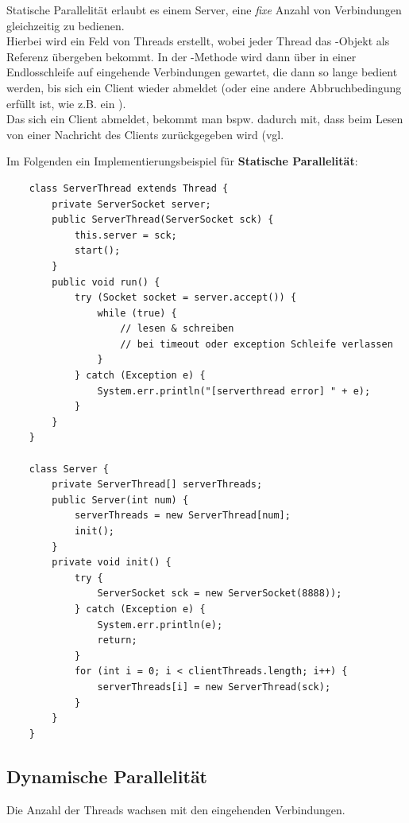 \noindent
Statische Parallelität erlaubt es einem Server, eine \textit{fixe} Anzahl von Verbindungen gleichzeitig zu bedienen.\\
Hierbei wird ein Feld von Threads erstellt, wobei jeder Thread das -Objekt als Referenz übergeben bekommt.
In der -Methode wird dann über  in einer Endlosschleife auf eingehende Verbindungen gewartet, die dann so lange bedient werden, bis sich ein Client wieder abmeldet (oder eine andere Abbruchbedingung erfüllt ist, wie z.B. ein ).\\
Das sich ein Client abmeldet, bekommt man bspw. dadurch mit, dass  beim Lesen von einer Nachricht des Clients zurückgegeben wird (vgl. \cite[286]{Oec22}

\noindent
Im Folgenden ein Implementierungsbeispiel für \textbf{Statische Parallelität}:
\begin{verbatim}
    class ServerThread extends Thread {
        private ServerSocket server;
        public ServerThread(ServerSocket sck) {
            this.server = sck;
            start();
        }
        public void run() {
            try (Socket socket = server.accept()) {
                while (true) {
                    // lesen & schreiben
                    // bei timeout oder exception Schleife verlassen
                }
            } catch (Exception e) {
                System.err.println("[serverthread error] " + e);
            }
        }
    }

    class Server {
        private ServerThread[] serverThreads;
        public Server(int num) {
            serverThreads = new ServerThread[num];
            init();
        }
        private void init() {
            try {
                ServerSocket sck = new ServerSocket(8888));
            } catch (Exception e) {
                System.err.println(e);
                return;
            }
            for (int i = 0; i < clientThreads.length; i++) {
                serverThreads[i] = new ServerThread(sck);
            }
        }
    }
\end{verbatim}

\subsection*{Dynamische Parallelität}
Die Anzahl der Threads wachsen mit den eingehenden Verbindungen.\\

